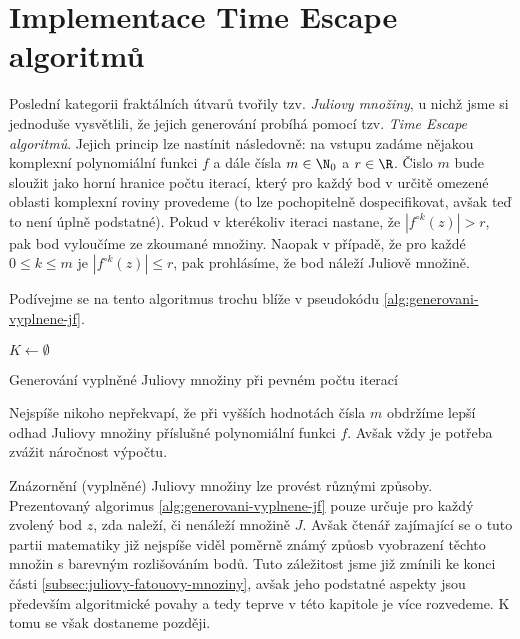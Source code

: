 \section{Implementace Time Escape algoritmů}\label{sec:implementace-tea}

Poslední kategorii fraktálních útvarů tvořily tzv. \emph{Juliovy množiny}, u nichž jsme si jednoduše vysvětlili, že jejich generování probíhá pomocí tzv. \emph{Time Escape algoritmů}. Jejich princip lze nastínit následovně: na vstupu zadáme nějakou komplexní polynomiální funkci $f$ a dále čísla $m\in\N_0$ a $r\in\R$. Čislo $m$ bude sloužit jako horní hranice počtu iterací, který pro každý bod v určitě omezené oblasti komplexní roviny provedeme (to lze pochopitelně dospecifikovat, avšak teď to není úplně podstatné). Pokud v kterékoliv iteraci nastane, že $|f^{\circ k}(z)|>r$, pak bod vyloučíme ze zkoumané množiny. Naopak v případě, že pro každé $0\leqslant k\leqslant m$ je $|f^{\circ k}(z)|\leqslant r$, pak prohlásíme, že bod náleží Juliově množině.

Podívejme se na tento algoritmus trochu blíže v pseudokódu \ref{alg:generovani-vyplnene-jf}.
\begin{algorithm}
    $K\gets\emptyset$\;
    \;
    \caption{Generování vyplněné Juliovy množiny při pevném počtu iterací}
    \label{alg:generovani-vyplnene-jf}
\end{algorithm}
Nejspíše nikoho nepřekvapí, že při vyšších hodnotách čísla $m$ obdržíme lepší odhad Juliovy množiny příslušné polynomiální funkci $f$. Avšak vždy je potřeba zvážit náročnost výpočtu.

Znázornění (vyplněné) Juliovy množiny lze provést různými způsoby. Prezentovaný algorimus \ref{alg:generovani-vyplnene-jf} pouze určuje pro každý zvolený bod $z$, zda naleží, či nenáleží množině $J$. Avšak čtenář zajímající se o tuto partii matematiky již nejspíše viděl poměrně známý způosb vyobrazení těchto množin s barevným rozlišováním bodů. Tuto záležitost jsme již zmínili ke konci části \ref{subsec:juliovy-fatouovy-mnoziny}, avšak jeho podstatné aspekty jsou především algoritmické povahy a tedy teprve v této kapitole je více rozvedeme. K tomu se však dostaneme později.

